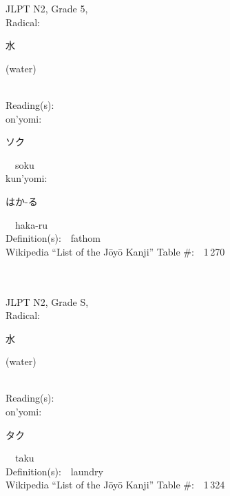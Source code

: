 \begin{multicols}{2}
{JLPT N2, Grade 5, \\Radical:\ \ {\begin{CJK}{UTF8}{min} 水 \end{CJK}} (water) } \\
Reading(s):\ \ \\
{\hspace*{1em}}on'yomi:\ \ \\
{\hspace*{2em}}{\begin{CJK}{UTF8}{min} ソク \end{CJK}}\ \ soku\ \ \\
{\hspace*{1em}}kun'yomi:\ \ \\
{\hspace*{2em}}{\begin{CJK}{UTF8}{min} はか-る \end{CJK}}\ \ haka-ru\ \ \\
Definition(s):\ \ fathom \\
Wikipedia ``List of the J\=oy\=o Kanji'' Table \#:\ \ 1\,270 \\
\ \ \\
{\fontsize{34pt}{40pt}  }\ \ \\  %
{JLPT N2, Grade S, \\Radical:\ \ {\begin{CJK}{UTF8}{min} 水 \end{CJK}} (water) } \\
Reading(s):\ \ \\
{\hspace*{1em}}on'yomi:\ \ \\
{\hspace*{2em}}{\begin{CJK}{UTF8}{min} タク \end{CJK}}\ \ taku\ \ \\
Definition(s):\ \ laundry \\
Wikipedia ``List of the J\=oy\=o Kanji'' Table \#:\ \ 1\,324 \\
\ \ \\
{\fontsize{34pt}{40pt}  }\ \ \\  %

\end{multicols}
